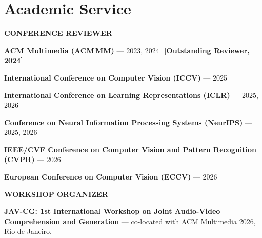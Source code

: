 \section{Academic Service}

\vspace{2pt}
{\rmfamily\bfseries\color{accent}\footnotesize\MakeUppercase{Conference Reviewer}}
\cvListStart
  \item \textbf{ACM Multimedia (ACM\,MM)} --- 2023, 2024 \,\,{\color{accent}\footnotesize\textbf{[Outstanding Reviewer, 2024]}}
  \item \textbf{International Conference on Computer Vision (ICCV)} --- 2025
  \item \textbf{International Conference on Learning Representations (ICLR)} --- 2025, 2026
  \item \textbf{Conference on Neural Information Processing Systems (NeurIPS)} --- 2025, 2026
  \item \textbf{IEEE/CVF Conference on Computer Vision and Pattern Recognition (CVPR)} --- 2026
  \item \textbf{European Conference on Computer Vision (ECCV)} --- 2026
\cvListEnd

\vspace{8pt}
{\rmfamily\bfseries\color{accent}\footnotesize\MakeUppercase{Workshop Organizer}}
\cvListStart
  \item \textbf{JAV-CG: 1st International Workshop on Joint Audio-Video Comprehension and Generation} --- co-located with ACM Multimedia 2026, Rio de Janeiro.
    \,\textperiodcentered\,
    \,\textperiodcentered\,
\cvListEnd
